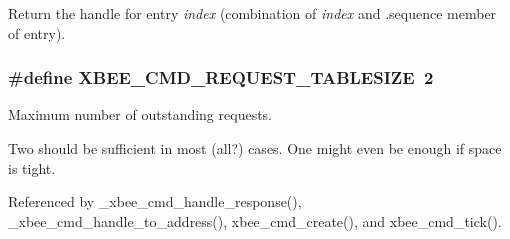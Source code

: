 Return the handle for entry {\itshape index} (combination of {\itshape index} and {\itshape }.sequence member of entry). 

\hypertarget{group__xbee__atcmd_gaf992e9b985e2b1eb185ef3d2d38a01c0}{
\subsubsection[{X\-B\-E\-E\-\_\-\-C\-M\-D\-\_\-\-R\-E\-Q\-U\-E\-S\-T\-\_\-\-T\-A\-B\-L\-E\-S\-I\-Z\-E}]{\setlength{\rightskip}{0pt plus 5cm}\#define X\-B\-E\-E\-\_\-\-C\-M\-D\-\_\-\-R\-E\-Q\-U\-E\-S\-T\-\_\-\-T\-A\-B\-L\-E\-S\-I\-Z\-E~2}}\label{group__xbee__atcmd_gaf992e9b985e2b1eb185ef3d2d38a01c0}


Maximum number of outstanding requests. 

Two should be sufficient in most (all?) cases. One might even be enough if space is tight. 

Referenced by \-\_\-xbee\-\_\-cmd\-\_\-handle\-\_\-response(), \-\_\-xbee\-\_\-cmd\-\_\-handle\-\_\-to\-\_\-address(), xbee\-\_\-cmd\-\_\-create(), and xbee\-\_\-cmd\-\_\-tick().


